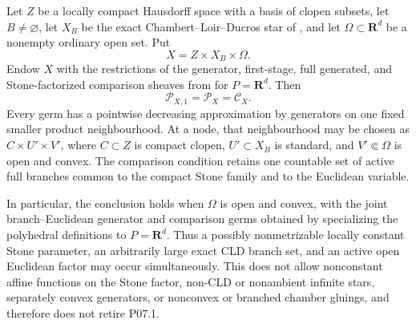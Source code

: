 
\begin{corollary}
\label{cor:p071-stone-infinite-star-euclidean-collapse}
Let $Z$ be a locally compact Hausdorff space with a basis of clopen
subsets, let $B\ne\varnothing$, let $X_B$ be the exact
Chambert--Loir--Ducros star of
, and let
$\Omega\subset\mathbf R^d$ be a nonempty ordinary open set.  Put
\[
                         X=Z\times X_B\times\Omega.
\]
Endow $X$ with the restrictions of the generator, first-stage, full
generated, and Stone-factorized comparison sheaves from
 for
$P=\mathbf R^d$.  Then
\begin{equation}
                 \mathcal P_{X,1}=\mathcal P_X=\mathcal C_X.
 \label{eq:p071-stone-infinite-euclidean-collapse}
\end{equation}
Every germ has a pointwise decreasing approximation by generators on one
fixed smaller product neighbourhood.  At a node, that neighbourhood may be
chosen as $C\times U'\times V'$, where $C\subset Z$ is compact clopen,
$U'\subset X_B$ is standard, and $V'\Subset\Omega$ is open and convex.
The comparison condition retains one countable set of active full branches
common to the compact Stone family and to the Euclidean variable.

In particular, the conclusion holds when $\Omega$ is open and convex, with
the joint branch--Euclidean generator and comparison germs obtained by
specializing the polyhedral definitions to $P=\mathbf R^d$.  Thus a
possibly nonmetrizable locally constant Stone parameter, an arbitrarily
large exact CLD branch set, and an active open Euclidean factor may occur
simultaneously.  This does not allow nonconstant affine functions on the
Stone factor, non-CLD or nonambient infinite stars, separately convex
generators, or nonconvex or branched chamber gluings, and therefore does not
retire P07.1.
\end{corollary}
